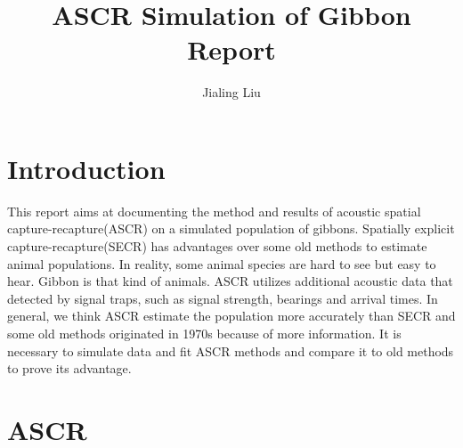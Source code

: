 \documentclass[10pt,a4paper,final]{article}
\title{ASCR Simulation of Gibbon Report}
\date{}
\author{Jialing Liu}
\begin{document}
\newcommand{\Int}{\int\limits}

\maketitle

\section{Introduction}
This report aims at documenting the method and results of acoustic spatial capture-recapture(ASCR) on a simulated population of gibbons.
Spatially explicit capture-recapture(SECR) has advantages over some old methods to estimate animal populations.
In reality, some animal species are hard to see but easy to hear. Gibbon is that kind of animals. ASCR utilizes additional acoustic data that detected by signal traps, such as signal strength, bearings and arrival times.
In general, we think ASCR estimate the population more accurately than SECR and some old methods originated in 1970s because of more information.
It is necessary to simulate data and fit ASCR methods and compare it to old methods to prove its advantage.

\section{ASCR}

\subsection{}
\end{document}
